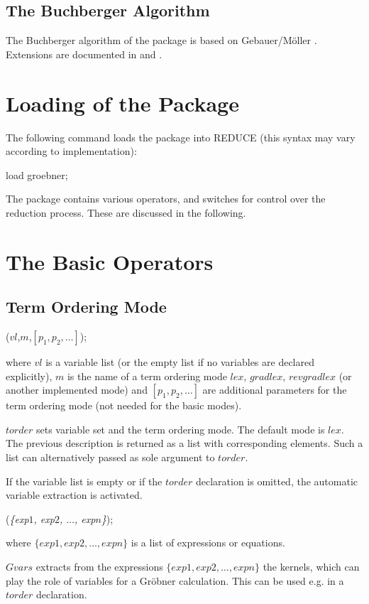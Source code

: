 \subsection{The Buchberger Algorithm}
The Buchberger algorithm of the package is based on {\sc
Gebauer/M\"oller} \cite{Gebauer:88}.
Extensions are documented in \cite{Melenk:88} and \cite{Giovini:91}.

\section{Loading of the Package}
The following command loads the package into
REDUCE (this syntax may vary according to implementation):
\begin{center}
load groebner;
\end{center}

The package contains various operators, and switches for control
over the reduction process. These are discussed in the following.

\section{The Basic Operators}

\subsection{Term Ordering Mode}

\begin{description}
\item [{\it torder}]($vl$,$m$,$[p_1,p_2,\ldots]$);

where $vl$ is a variable list (or the empty list if
no variables are declared explicitly),
$m$ is the name of a term ordering mode $lex$, $gradlex$,
$revgradlex$ (or another implemented mode) and
$[p_1,p_2,\ldots]$ are additional parameters for the
term ordering mode (not needed for the basic modes).

$torder$ sets variable set and the term ordering mode.
The default mode is $lex$. The previous description is returned
as a list with corresponding elements. Such a list can
alternatively passed as sole argument to $torder$.

If the variable list is empty or if the $torder$ declaration
is omitted, the automatic variable extraction is activated.

\item[{\it gvars}] ({\it\{exp$1$, exp$2$, $ \ldots$, exp$n$\}});

 where $\{exp1, exp2, \ldots , expn\}$ is a list of expressions or
equations.

$Gvars$ extracts from the expressions $\{exp1, exp2, \ldots , expn\}$
the kernels, which can play the role of variables for a Gr\"obner
calculation. This can be used e.g. in a $torder$ declaration.
\end{description}

